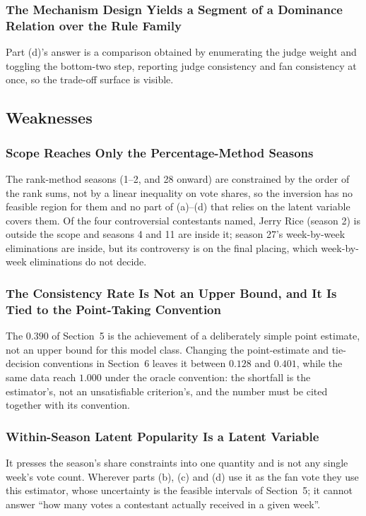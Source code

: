 \subsubsection{The Mechanism Design Yields a Segment of a Dominance Relation over the Rule Family}
Part (d)'s answer is a comparison obtained by enumerating the judge weight and toggling the bottom-two step, reporting judge consistency and fan consistency at once, so the trade-off surface is visible.

\subsection{Weaknesses}

\subsubsection{Scope Reaches Only the Percentage-Method Seasons}
The rank-method seasons (1--2, and 28 onward) are constrained by the order of the rank sums, not by a linear inequality on vote shares, so the inversion has no feasible region for them and no part of (a)--(d) that relies on the latent variable covers them. Of the four controversial contestants named, Jerry Rice (season 2) is outside the scope and seasons 4 and 11 are inside it; season 27's week-by-week eliminations are inside, but its controversy is on the final placing, which week-by-week eliminations do not decide.

\subsubsection{The Consistency Rate Is Not an Upper Bound, and It Is Tied to the Point-Taking Convention}
The $0.390$ of Section~5 is the achievement of a deliberately simple point estimate, not an upper bound for this model class. Changing the point-estimate and tie-decision conventions in Section~6 leaves it between $0.128$ and $0.401$, while the same data reach $1.000$ under the oracle convention: the shortfall is the estimator's, not an unsatisfiable criterion's, and the number must be cited together with its convention.

\subsubsection{Within-Season Latent Popularity Is a Latent Variable}
It presses the season's share constraints into one quantity and is not any single week's vote count. Wherever parts (b), (c) and (d) use it as the fan vote they use this estimator, whose uncertainty is the feasible intervals of Section~5; it cannot answer ``how many votes a contestant actually received in a given week''.

